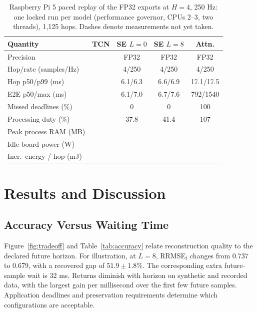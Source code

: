 \documentclass[letterpaper,journal]{IEEEtran}
\newcommand{\blank}{\textemdash}
\begin{document}
\begin{table}[t]
\caption{Raspberry Pi 5 paced replay of the FP32 exports at $H=4$, 250 Hz: one locked run per model (performance governor, CPUs 2--3, two threads), 1,125 hops. Dashes denote measurements not yet taken.}
\label{tab:device}
\centering\footnotesize
\begin{tabular}{@{}lcccc@{}}
\toprule
Quantity & TCN & SE $L=0$ & SE $L=8$ & Attn.\\
\midrule
Precision & \blank & FP32 & FP32 & FP32\\
Hop/rate (samples/Hz) & \blank & 4/250 & 4/250 & 4/250\\
Hop p50/p99 (ms) & \blank & 6.1/6.3 & 6.6/6.9 & 17.1/17.5\\
E2E p50/max (ms) & \blank & 6.1/7.0 & 6.7/7.6 & 792/1540\\
Missed deadlines (\%) & \blank & 0 & 0 & 100\\
Processing duty (\%) & \blank & 37.8 & 41.4 & 107\\
Peak process RAM (MB) & \blank & \blank & \blank & \blank\\
Idle board power (W) & \blank & \blank & \blank & \blank\\
Incr.\ energy / hop (mJ) & \blank & \blank & \blank & \blank\\
\bottomrule
\end{tabular}
\end{table}

\section{Results and Discussion}
\subsection{Accuracy Versus Waiting Time}
Figure~\ref{fig:tradeoff} and Table~\ref{tab:accuracy} relate reconstruction quality to the declared future horizon. For illustration, at $L=8$, RRMSE$_t$ changes from 0.737 to 0.679, with a recovered gap of $51.9\pm1.8$\%. The corresponding extra future-sample wait is 32 ms. Returns diminish with horizon on synthetic and recorded data, with the largest gain per millisecond over the first few future samples.
Application deadlines and preservation requirements determine which configurations are acceptable.
\end{document}
